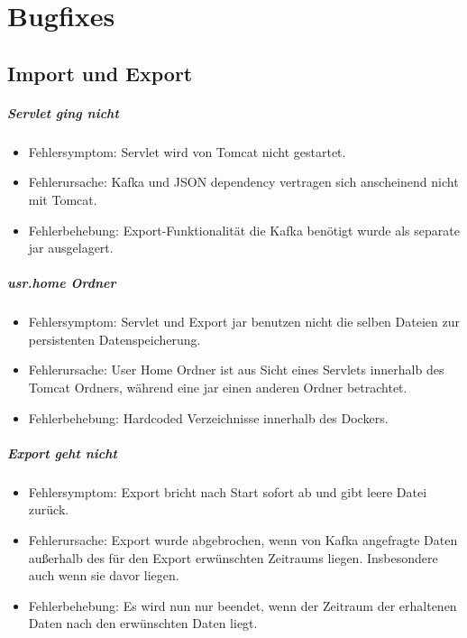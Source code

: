 \chapter{Bugfixes}

\section{Import und Export}
\paragraph{Servlet ging nicht}
\begin{itemize}
	\item Fehlersymptom: Servlet wird von Tomcat nicht gestartet.
	\item Fehlerursache: Kafka und JSON dependency vertragen sich anscheinend nicht mit Tomcat.
	\item Fehlerbehebung: Export-Funktionalität die Kafka benötigt wurde als separate jar ausgelagert.
\end{itemize}

\paragraph{usr.home Ordner}
\begin{itemize}
	\item Fehlersymptom: Servlet und Export jar benutzen nicht die selben Dateien zur persistenten Datenspeicherung.
	\item Fehlerursache: User Home Ordner ist aus Sicht eines Servlets innerhalb des Tomcat Ordners, während eine jar einen anderen Ordner betrachtet.
	\item Fehlerbehebung: Hardcoded Verzeichnisse innerhalb des Dockers.
\end{itemize}

\paragraph{Export geht nicht}
\begin{itemize}
	\item Fehlersymptom: Export bricht nach Start sofort ab und gibt leere Datei zurück.
	\item Fehlerursache: Export wurde abgebrochen, wenn von Kafka angefragte Daten außerhalb des für den Export erwünschten Zeitraums liegen. Insbesondere auch wenn sie davor liegen.
	\item Fehlerbehebung: Es wird nun nur beendet, wenn der Zeitraum der erhaltenen Daten nach den erwünschten Daten liegt.
\end{itemize}

